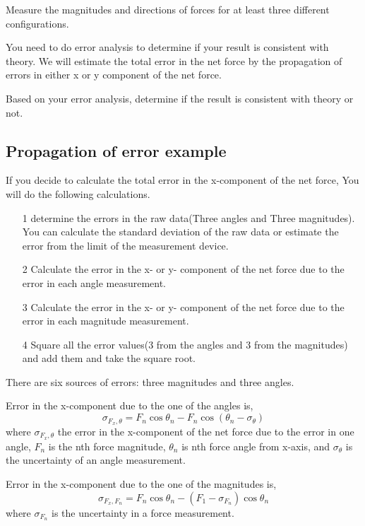 Measure the magnitudes and directions of forces for at least three different configurations. 


\analysis

You need to do error analysis to determine if your result is
consistent with theory. We will estimate the total error in
the net force by the propagation of errors in either x or y component
of the net force.

Based on your error analysis, determine if the result is consistent with theory or not. 

\subsection*{Propagation of error example}
If you decide to calculate the total error in the x-component of the net force, You will do the following calculations. 
\begin{itemize}
\item[1] determine the errors in the raw data(Three angles and Three magnitudes). You can calculate the standard deviation of the raw data or estimate the error from the limit of the measurement device. 
\item[2] Calculate the error in the x- or y- component of the net force due to the error in each angle measurement.
\item[3] Calculate the error in the x- or y- component of the net force due to the error in each magnitude measurement.
\item[4] Square all the error values(3 from the angles and 3 from the magnitudes) and add them and take the square root. 
\end{itemize}
There are six sources of errors: three magnitudes and three angles. 

Error in the x-component due to the one of the angles is,
\begin{equation*}
\sigma_{F_x,\theta} = F_n \cos\theta_n-F_n \cos\left(\theta_n-\sigma_\theta\right)  
\end{equation*} 
where $\sigma_{F_x,\theta}$ the error in the x-component of the net force due to the error in one angle, $F_n$ is the nth force magnitude, $\theta_n$ is nth force angle from x-axis, and $\sigma_\theta$ is the uncertainty of an angle measurement. 

Error in the x-component due to the one of the magnitudes is,
\begin{equation*}
\sigma_{F_x,F_n} = F_n \cos\theta_n-\left(F_1-\sigma_{F_n} \right)\cos\theta_n  
\end{equation*} 
where $\sigma_{F_n}$ is the uncertainty in a force measurement. 

